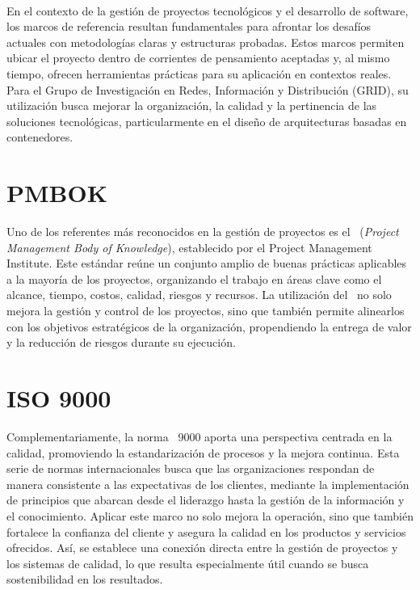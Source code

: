\label{cap:marcoTeorico}
\mbox{}\\
En el contexto de la gestión de proyectos tecnológicos y el desarrollo de software, los marcos de referencia resultan fundamentales para afrontar los desafíos actuales con metodologías claras y estructuras probadas. Estos marcos permiten ubicar el proyecto dentro de corrientes de pensamiento aceptadas y, al mismo tiempo, ofrecen herramientas prácticas para su aplicación en contextos reales. Para el Grupo de Investigación en Redes, Información y Distribución (GRID), su utilización busca mejorar la organización, la calidad y la pertinencia de las soluciones tecnológicas, particularmente en el diseño de arquitecturas basadas en contenedores.

\section{PMBOK}
\noindent
Uno de los referentes más reconocidos en la gestión de proyectos es el \PMBOK\ (\textit{Project Management Body of Knowledge}), establecido por el Project Management Institute. Este estándar reúne un conjunto amplio de buenas prácticas aplicables a la mayoría de los proyectos, organizando el trabajo en áreas clave como el alcance, tiempo, costos, calidad, riesgos y recursos\citep{project2017guia}. La utilización del \PMBOK\ no solo mejora la gestión y control de los proyectos, sino que también permite alinearlos con los objetivos estratégicos de la organización, propendiendo la entrega de valor y la reducción de riesgos durante su ejecución\citep{Monday2022}.

\section{ISO 9000}
\noindent
Complementariamente, la norma \ISO\ 9000 aporta una perspectiva centrada en la calidad, promoviendo la estandarización de procesos y la mejora continua\citep{ISO9001}. Esta serie de normas internacionales busca que las organizaciones respondan de manera consistente a las expectativas de los clientes, mediante la implementación de principios que abarcan desde el liderazgo hasta la gestión de la información y el conocimiento. Aplicar este marco no solo mejora la operación, sino que también fortalece la confianza del cliente y asegura la calidad en los productos y servicios ofrecidos\citep{Gray2022}. Así, se establece una conexión directa entre la gestión de proyectos y los sistemas de calidad, lo que resulta especialmente útil cuando se busca sostenibilidad en los resultados.

